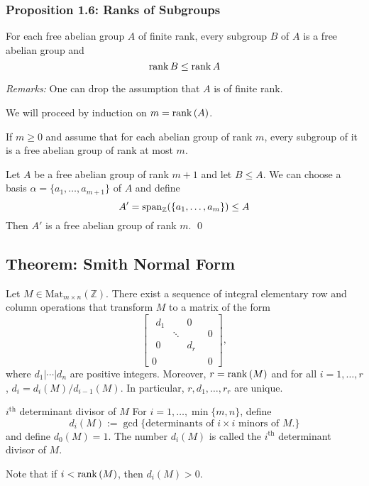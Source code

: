 \documentclass{article}
\renewenvironment{proof}{{\bfseries\color{blue1} Proof:}}{\qed}
\begin{document}
\subsubsection{Proposition 1.6: Ranks of Subgroups}
\begin{idea}
    For each free abelian group $A$ of finite rank, every subgroup $B$ of $A$ is a free abelian group and
    \begin{equation*}
        \mathrm{rank}\,B \le \mathrm{rank}\,A
    \end{equation*}
\end{idea}
\textit{Remarks:} One can drop the assumption that $A$ is of finite rank.

\begin{proof}
    We will proceed by induction on $m=\mathrm{rank}\,(A)$.

    If $m \ge 0$ and assume that for each abelian group of rank $m$, every subgroup of it is a free abelian group of rank at most $m$.

    Let $A$ be a free abelian group of rank $m+1$ and let $B \le A$. We can choose a basis $\alpha=\{a_1,\dots,a_{m+1}\}$ of $A$ and define
    \begin{equation*}
        A' = \mathrm{span}_{\mathbb{Z}}(\{a_1,\dots,a_m\}) \le A
    \end{equation*}
    Then $A'$ is a free abelian group of rank $m$.
\end{proof}

\subsection{Theorem: Smith Normal Form}
\begin{idea}
    Let $M \in \text{Mat}_{m\times n}(\mathbb{Z})$. There exist a sequence of integral elementary row and column operations that transform $M$ to a matrix of the form
    \begin{equation*}
        \left[
        \begin{array}{c|c}
            \begin{array}{ccc}
                d_1 &        & 0   \\
                    & \ddots &     \\
                0   &        & d_r
            \end{array} & 0 \\
            \hline
            0                          & 0
        \end{array}
        \right],
    \end{equation*}
    where $d_1|\cdots|d_n$ are positive integers. Moreover, $r=\mathrm{rank}\,(M)$ and for all $i=1,\dots,r$, $d_i=d_i(M)/d_{i-1}(M)$. In particular, $r,d_1,\dots,r_r$ are unique.
\end{idea}
\begin{definition}{$i^\text{th}$ determinant divisor of $M$}
    For $i=1,\dots,\min\{m,n\}$, define
    \begin{equation*}
        d_i(M) := \gcd\{\text{determinants of $i\times i$ minors of $M$.}\}
    \end{equation*}
    and define $d_0(M)=1$. The number $d_i(M)$ is called the $i^\text{th}$ determinant divisor of $M$.
\end{definition}
Note that if $i < \mathrm{rank}\,(M)$, then $d_i(M) > 0$.
\end{document}
